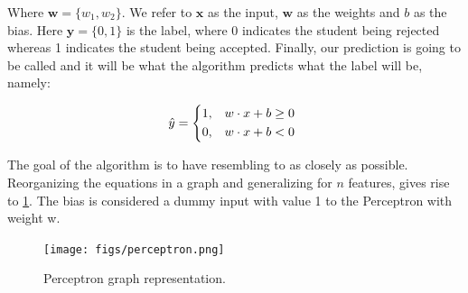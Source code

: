 Where $\textbf{w} = \{w_{1}, w_{2}\}$. We refer to $\textbf{x}$ as the input, $\textbf{w}$ as the weights and $b$ as the bias. Here $\textbf{y} = \{0, 1\}$ is the label, where 0 indicates the student being rejected whereas 1 indicates the student being accepted. Finally, our prediction is going to be called \mbox{} and it will be what the algorithm predicts what the label will be, namely:

\begin{equation}
  \label{y_hat}
  \hat{y} =
  \begin{dcases*}
    \text{1,}  &$w\cdot x + b \geq 0$ \\
    \text{0,}  &$w\cdot x + b < 0$
  \end{dcases*}
\end{equation}

The goal of the algorithm is to have \mbox{} resembling to \mbox{} as closely as possible. Reorganizing the equations in a graph and generalizing for $n$ features, gives rise to \cref{fig:neuron}. The bias is considered a dummy input with value 1 to the Perceptron with weight w.

\begin{figure}[H]
  \centering
  \texttt{[image: figs/perceptron.png]}
  \caption{Perceptron graph representation.}\label{fig:neuron}
\end{figure}

